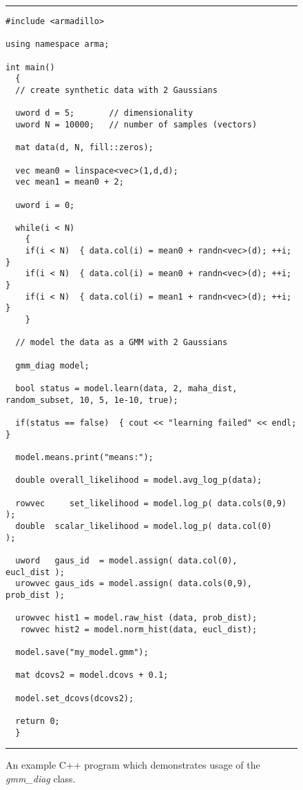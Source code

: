 \begin{figure}
\hrule
\vspace{0.5ex}
\begin{Verbatim}[fontsize=\footnotesize,fontseries=b]
#include <armadillo>

using namespace arma;

int main()
  {
  // create synthetic data with 2 Gaussians
  
  uword d = 5;       // dimensionality
  uword N = 10000;   // number of samples (vectors)
  
  mat data(d, N, fill::zeros);
  
  vec mean0 = linspace<vec>(1,d,d);
  vec mean1 = mean0 + 2;
  
  uword i = 0;
  
  while(i < N)
    {
    if(i < N)  { data.col(i) = mean0 + randn<vec>(d); ++i; }
    if(i < N)  { data.col(i) = mean0 + randn<vec>(d); ++i; }
    if(i < N)  { data.col(i) = mean1 + randn<vec>(d); ++i; }
    }
  
  // model the data as a GMM with 2 Gaussians
  
  gmm_diag model;
  
  bool status = model.learn(data, 2, maha_dist, random_subset, 10, 5, 1e-10, true);
  
  if(status == false)  { cout << "learning failed" << endl; }
  
  model.means.print("means:");
  
  double overall_likelihood = model.avg_log_p(data);
  
  rowvec     set_likelihood = model.log_p( data.cols(0,9) );
  double  scalar_likelihood = model.log_p( data.col(0)    );
  
  uword   gaus_id  = model.assign( data.col(0),    eucl_dist );
  urowvec gaus_ids = model.assign( data.cols(0,9), prob_dist );
  
  urowvec hist1 = model.raw_hist (data, prob_dist);
   rowvec hist2 = model.norm_hist(data, eucl_dist);
  
  model.save("my_model.gmm");
  
  mat dcovs2 = model.dcovs + 0.1;
  
  model.set_dcovs(dcovs2);
  
  return 0;
  }
\end{Verbatim}
\vspace{-1ex}
\hrule
\vspace{0.5ex}
\caption
  {
  An example C++ program which demonstrates usage of the {\it gmm\_diag} class.
  }
\label{fig:example_usage}
\end{figure}
